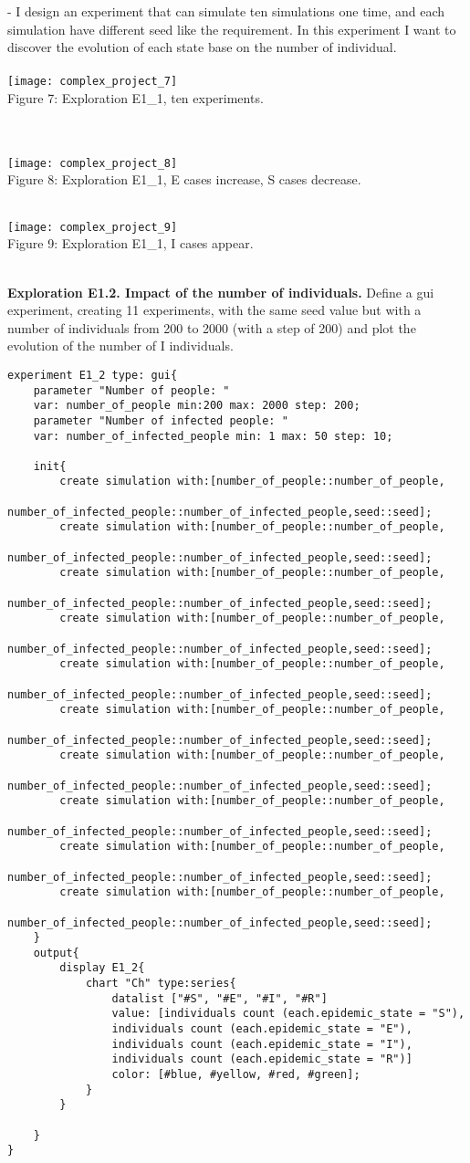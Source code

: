\documentclass{article}
\begin{document}
- I design an experiment that can simulate ten simulations one time, and each simulation have different seed like the requirement. In this experiment I want to discover the evolution of each state base on the number of individual.
\\\\
\texttt{[image: complex\_project\_7]}
\\
\caption{Figure 7: Exploration E1\_1, ten experiments.}
\\\\
\texttt{[image: complex\_project\_8]}
\\
\caption{Figure 8: Exploration E1\_1, E cases increase, S cases decrease.}
\\
\texttt{[image: complex\_project\_9]}
\\
\caption{Figure 9: Exploration E1\_1, I cases appear.}
\\
\textbf{Exploration E1.2. Impact of the number of individuals.}
Define a gui experiment, creating 11 experiments, with the same seed value but with a number of individuals from 200 to 2000 (with a step of 200) and plot the evolution of the number of I individuals.
\begin{lstlisting}
experiment E1_2 type: gui{
	parameter "Number of people: " 
	var: number_of_people min:200 max: 2000 step: 200;
	parameter "Number of infected people: " 
	var: number_of_infected_people min: 1 max: 50 step: 10;
	
	init{
		create simulation with:[number_of_people::number_of_people,
		number_of_infected_people::number_of_infected_people,seed::seed];
		create simulation with:[number_of_people::number_of_people,
		number_of_infected_people::number_of_infected_people,seed::seed];
		create simulation with:[number_of_people::number_of_people,
		number_of_infected_people::number_of_infected_people,seed::seed];
		create simulation with:[number_of_people::number_of_people,
		number_of_infected_people::number_of_infected_people,seed::seed];
		create simulation with:[number_of_people::number_of_people,
		number_of_infected_people::number_of_infected_people,seed::seed];
		create simulation with:[number_of_people::number_of_people,
		number_of_infected_people::number_of_infected_people,seed::seed];
		create simulation with:[number_of_people::number_of_people,
		number_of_infected_people::number_of_infected_people,seed::seed];
		create simulation with:[number_of_people::number_of_people,
		number_of_infected_people::number_of_infected_people,seed::seed];
		create simulation with:[number_of_people::number_of_people,
		number_of_infected_people::number_of_infected_people,seed::seed];
		create simulation with:[number_of_people::number_of_people,
		number_of_infected_people::number_of_infected_people,seed::seed];
	}
	output{
		display E1_2{
			chart "Ch" type:series{
				datalist ["#S", "#E", "#I", "#R"] 
				value: [individuals count (each.epidemic_state = "S"), 					
				individuals count (each.epidemic_state = "E"),  					
				individuals count (each.epidemic_state = "I"), 				
				individuals count (each.epidemic_state = "R")] 		  					
				color: [#blue, #yellow, #red, #green];
			}
		}
		
	}
}
\end{lstlisting}
\end{document}
